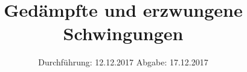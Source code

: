 

\subject{354}
\title{Gedämpfte und erzwungene Schwingungen}
\date{%
  Durchführung: 12.12.2017
  \hspace{3em}
  Abgabe: 17.12.2017
}



\maketitle
\thispagestyle{empty}
\tableofcontents
\newpage






\printbibliography{}


